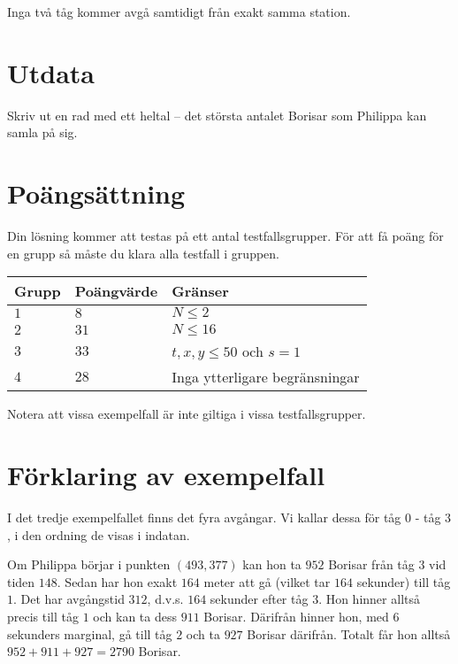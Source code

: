 Inga två tåg kommer avgå samtidigt från exakt samma station.

\section*{Utdata}
Skriv ut en rad med ett heltal -- det största antalet Borisar som Philippa kan samla på sig.

\section*{Poängsättning}
Din lösning kommer att testas på ett antal testfallsgrupper.
För att få poäng för en grupp så måste du klara alla testfall i gruppen.

\noindent
\begin{tabular}{| l | l | l |}
  \hline
  Grupp & Poängvärde & Gränser \\ \hline
  $1$   & $8$        & $N \le 2$ \\ \hline
  $2$   & $31$       & $N \le 16$ \\ \hline
  $3$   & $33$       & $t,x,y\le 50$ och $s = 1$ \\ \hline
  $4$   & $28$       & Inga ytterligare begränsningar \\ \hline
\end{tabular}

Notera att vissa exempelfall är inte giltiga i vissa testfallsgrupper.

\section*{Förklaring av exempelfall}
I det tredje exempelfallet finns det fyra avgångar.
Vi kallar dessa för tåg $0$ - tåg $3$, i den ordning de visas i indatan.

Om Philippa börjar i punkten $(493,377)$ kan hon ta $952$ Borisar från tåg $3$ vid tiden $148$. Sedan har hon exakt $164$ meter att gå (vilket tar $164$ sekunder) till tåg $1$. Det har avgångstid $312$, d.v.s. $164$ sekunder efter tåg $3$. 
Hon hinner alltså precis till tåg $1$ och kan ta dess $911$ Borisar. Därifrån hinner hon, med $6$ sekunders marginal, gå till tåg $2$ och ta $927$ Borisar därifrån. Totalt får hon alltså $952+911+927=2790$ Borisar. 

